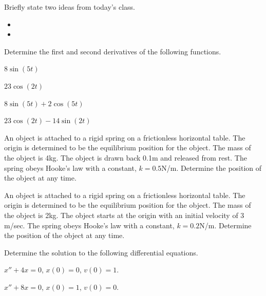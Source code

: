 \postClass

\begin{problem}
\item Briefly state two ideas from today's class.
  \begin{itemize}
  \item
  \item
  \end{itemize}
\item Determine the first and second derivatives of the following functions.
  \begin{subproblem}
  \item $8\sin(5t)$
    \vfill
  \item $23\cos(2t)$
    \vfill
  \item $8\sin(5t)+2\cos(5t)$
    \vfill
  \item $23\cos(2t)-14\sin(2t)$
    \vfill
  \end{subproblem}
  \item An object is attached to a rigid spring on a frictionless
    horizontal table. The origin is determined to be the equilibrium
    position for the object. The mass of the object is 4kg. The object
    is drawn back 0.1m and released from rest. The spring obeys Hooke's
    law with a constant, $k=0.5$N/m. Determine the position of the object
    at any time.
  \item An object is attached to a rigid spring on a frictionless
      horizontal table. The origin is determined to be the equilibrium
      position for the object. The mass of the object is 2kg. The object
      starts at the origin with an initial velocity of 3 m/sec.
      The spring obeys Hooke's law with a constant, $k=0.2$N/m.
      Determine the position of the object at any time.
\end{problem}


\begin{problem}
\item Determine the solution to the following differential equations.
  \begin{subproblem}
  \item $x'' + 4 x  =  0$, $x(0)=0$, $v(0)=1$.
    \vfill
  \item $x'' + 8 x  =  0$, $x(0)=1$, $v(0)=0$.
    \vfill
  \end{subproblem}
\end{problem}


